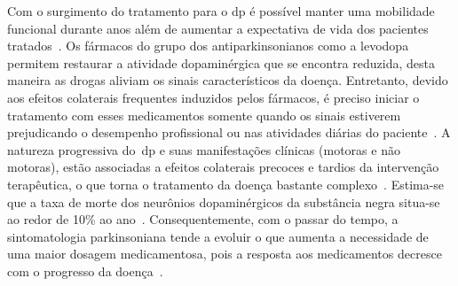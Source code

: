 Com o surgimento do tratamento para o \ac{dp} é possível manter uma mobilidade funcional durante anos além de aumentar a expectativa de vida dos pacientes tratados~\cite{rodrigues2006}. Os fármacos do grupo dos antiparkinsonianos como a levodopa permitem restaurar a atividade dopaminérgica que se encontra reduzida, desta maneira as drogas aliviam os sinais característicos da doença. Entretanto, devido aos efeitos colaterais frequentes induzidos pelos fármacos, é preciso iniciar o tratamento com esses medicamentos somente quando os sinais estiverem prejudicando o desempenho profissional ou nas atividades diárias do paciente~\cite{rodrigues2006}. A natureza progressiva do~\ac{dp} e suas manifestações clínicas (motoras e não motoras), estão associadas a efeitos colaterais precoces e tardios da intervenção terapêutica, o que torna o tratamento da doença bastante complexo~\cite{protpar010}. Estima-se que a taxa de morte dos neurônios dopaminérgicos da substância negra situa-se 
ao redor de 10$\%$ ao ano~\cite{national2006parkinson}. Consequentemente, com o passar do tempo, a sintomatologia parkinsoniana tende a evoluir o que aumenta a necessidade de uma maior dosagem medicamentosa, pois a resposta aos medicamentos decresce com o progresso da doença~\cite{protpar010}.


 

